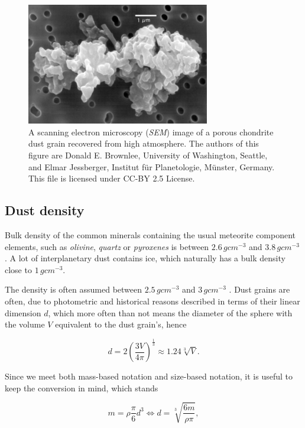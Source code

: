 \begin{figure}[h]
 	\centering
 	\includegraphics[width=8cm]{figures/grain.jpg}
 	\caption{A scanning electron microscopy (\textit{SEM}) image of a porous chondrite dust grain recovered from high atmosphere.  The authors of this figure are Donald E. Brownlee, University of Washington, Seattle, and Elmar Jessberger, Institut für Planetologie, Münster, Germany.
This file is licensed under CC-BY 2.5 License.}
 	\label{fig:dust_grain}
\end{figure}

\subsection{Dust density} \label{sec:density}

Bulk density of the common minerals containing the usual meteorite component elements, such as \textit{olivine}, \textit{quartz} or \textit{pyroxenes} is between $2.6 \, \si{g cm^{-3}}$ and $3.8 \, \si{g cm^{-3}}$ \citep{duda1986minerals}. A lot of interplanetary dust contains ice, which naturally has a bulk density close to $1 \, \si{g cm^{-3}}$.

The density is often assumed between $2.5 \, \si{g cm^{-3}}$ \citep{mann2014dust} and $3 \, \si{g cm^{-3}}$ \citep{mcdonnell1984cosmic}. Dust grains are often, due to photometric and historical reasons described in terms of their linear dimension $d$, which more often than not means the diameter of the sphere with the volume $V$ equivalent to the dust grain's, hence

\begin{equation}
    d = 2 \left( {\frac{3V}{4\pi}} \right)^{\frac{1}{3}} \approx 1.24 \sqrt[3]{V}.
\end{equation}

Since we meet both mass-based notation and size-based notation, it is useful to keep the conversion in mind, which stands

\begin{equation}
    m = \rho \frac{\pi}{6} d^3 \Leftrightarrow d = \sqrt[3]{\frac{6 m}{\rho \pi}},
\end{equation}

